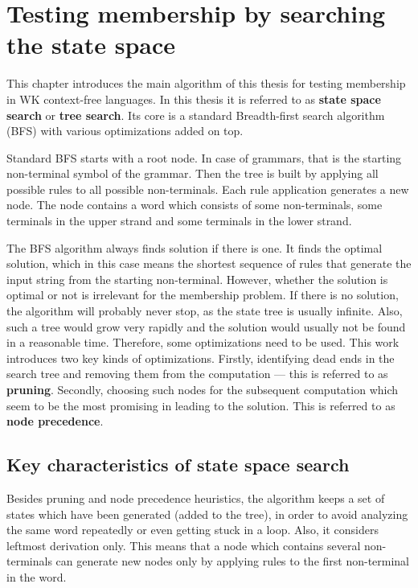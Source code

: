 \chapter{Testing membership by searching the state space} \label{chapter:parse_tree}
This chapter introduces the main algorithm of this thesis for testing membership in WK context-free languages. In this thesis it is referred to as \textbf{state space search} or \textbf{tree search}. Its core is a standard Breadth-first search algorithm (BFS) with various optimizations added on top.

Standard BFS starts with a root node. In case of grammars, that is the starting non-terminal symbol of the grammar. Then the tree is built by applying all possible rules to all possible non-terminals. Each rule application generates a new node. The node contains a word which consists of some non-terminals, some terminals in the upper strand and some terminals in the lower strand.

The BFS algorithm always finds solution if there is one. It finds the optimal solution, which in this case means the shortest sequence of rules that generate the input string from the starting non-terminal. However, whether the solution is optimal or not is irrelevant for the membership problem. If there is no solution, the algorithm will probably never stop, as the state tree is usually infinite. Also, such a tree would grow very rapidly and the solution would usually not be found in a reasonable time. Therefore, some optimizations need to be used. This work introduces two key kinds of optimizations. Firstly, identifying dead ends in the search tree and removing them from the computation --- this is referred to as \textbf{pruning}. Secondly, choosing such nodes for the subsequent computation which seem to be the most promising in leading to the solution. This is referred to as \textbf{node precedence}.

\section{Key characteristics of state space search}
Besides pruning and node precedence heuristics, the algorithm keeps a set of states which have been generated (added to the tree), in order to avoid analyzing the same word repeatedly or even getting stuck in a loop. Also, it considers leftmost derivation only. This means that a node which contains several non-terminals can generate new nodes only by applying rules to the first non-terminal in the word.


